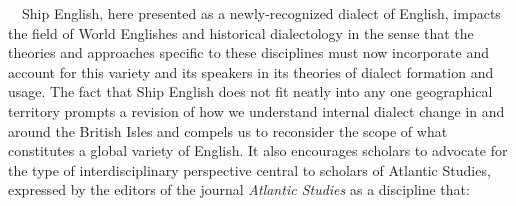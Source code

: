 \begin{styleStandard}
\ \ Ship English, here presented as a newly-recognized dialect of English, impacts the field of World Englishes and historical dialectology in the sense that the theories and approaches specific to these disciplines must now incorporate and account for this variety and its speakers in its theories of dialect formation and usage. The fact that Ship English does not fit neatly into any one geographical territory prompts a revision of how we understand internal dialect change in and around the British Isles and compels us to reconsider the scope of what constitutes a global variety of English. It also encourages scholars to advocate for the type of interdisciplinary perspective central to scholars of Atlantic Studies, expressed by the editors of the journal \textit{Atlantic Studies} as a discipline that:
\end{styleStandard}



